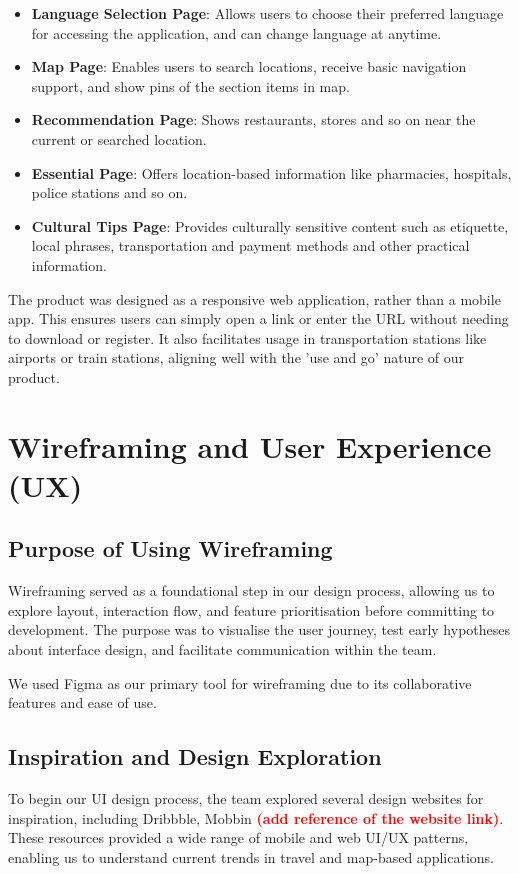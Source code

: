 \begin{itemize}
    \item \textbf{Language Selection Page}: Allows users to choose their preferred language for accessing the application, and can change language at anytime.
    \item \textbf{Map Page}: Enables users to search locations, receive basic navigation support, and show pins of the section items in map.
    \item \textbf{Recommendation Page}: Shows restaurants, stores and so on near the current or searched location.
    \item \textbf{Essential Page}: Offers location-based information like pharmacies, hospitals, police stations and so on.
    \item \textbf{Cultural Tips Page}: Provides culturally sensitive content such as etiquette, local phrases, transportation and payment methods and other practical information.
\end{itemize}
The product was designed as a responsive web application, rather than a mobile app. This ensures users can simply open a link or enter the URL without needing to download or register. It also facilitates usage in transportation stations like airports or train stations, aligning well with the 'use and go' nature of our product.

\section{Wireframing and User Experience (UX)}

\subsection{Purpose of Using Wireframing}
Wireframing served as a foundational step in our design process, allowing us to explore layout, interaction flow, and feature prioritisation before committing to development. The purpose was to visualise the user journey, test early hypotheses about interface design, and facilitate communication within the team.

We used Figma as our primary tool for wireframing due to its collaborative features and ease of use.

\subsection{Inspiration and Design Exploration}
To begin our UI design process, the team explored several design websites for inspiration, including Dribbble, Mobbin \textbf{\textcolor{red}{(add reference of the website link)}}. These resources provided a wide range of mobile and web UI/UX patterns, enabling us to understand current trends in travel and map-based applications.


